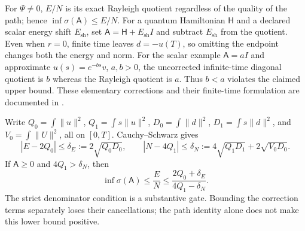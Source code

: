 \documentclass[11pt]{article}
\numberwithin{equation}{section}
\theoremstyle{definition}
\theoremstyle{remark}
\begin{document}
For $\Psi\ne0$, $E/N$ is its exact Rayleigh quotient regardless of
the quality of the path; hence $\inf\sigma(\mathsf A)\le E/N$.
For a quantum Hamiltonian $\mathsf H$ and a declared scalar energy shift
$E_{\mathrm{sh}}$, set $\mathsf A=\mathsf H+E_{\mathrm{sh}}I$ and subtract
$E_{\mathrm{sh}}$ from the quotient.  Even when $r=0$, finite time
leaves $d=-u(T)$, so omitting the endpoint changes both the energy
and norm.  For the scalar example $\mathsf A=aI$ and approximate
$u(s)=e^{-bs}v$, $a,b>0$, the uncorrected infinite-time diagonal
quotient is $b$ whereas the Rayleigh quotient is $a$.  Thus $b<a$
violates the claimed upper bound.  These elementary corrections and
their finite-time formulation are documented in \cite{residualnote}.

Write $Q_0=\int\|u\|^2$, $Q_1=\int s\|u\|^2$,
$D_0=\int\|d\|^2$, $D_1=\int s\|d\|^2$, and
$V_0=\int\|U\|^2$, all on $[0,T]$.  Cauchy--Schwarz gives
\begin{equation}\label{eq:generic-residual-bounds}
 |E-2Q_0|\le\delta_E:=2\sqrt{Q_0D_0},\qquad
 |N-4Q_1|\le\delta_N:=4\sqrt{Q_1D_1}+2\sqrt{V_0D_0}.
\end{equation}
If $\mathsf A\ge0$ and $4Q_1>\delta_N$, then
\begin{equation}\label{eq:generic-rayleigh-upper}
 \inf\sigma(\mathsf A)\le\frac EN
 \le\frac{2Q_0+\delta_E}{4Q_1-\delta_N}.
\end{equation}
The strict denominator condition is a substantive gate.  Bounding
the correction terms separately loses their cancellations; the path
identity alone does not make this lower bound positive.
\end{document}
